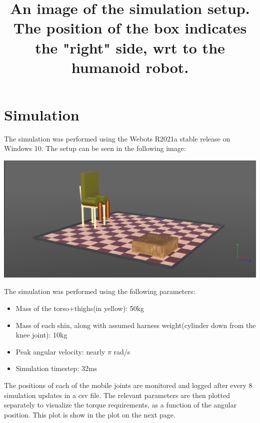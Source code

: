 \documentclass[a4paper]{article}
\begin{document}
	\pagebreak
	\section{Simulation}
		The simulation was performed using the Webots R2021a stable release on Windows 10. The setup can be seen in the following image:

		\begin{center}
			\includegraphics[width=\linewidth]{"../images/sideview.png"}
			\title{An image of the simulation setup. The position of the box indicates the "right" side, wrt to the humanoid robot.}
		\end{center}

		The simulation was performed using the following parameters:
		\begin{itemize}
			\item Mass of the torso+thighs(in yellow): 50kg
			\item Mass of each shin, along with assumed harness weight(cylinder down from the knee joint): 10kg
			\item Peak angular velocity: nearly $\pi$ rad/s
			\item Simulation timestep: 32ms
		\end{itemize}

		The positions of each of the mobile joints are monitored and logged after every 8 simulation updates in a csv file. The relevant parameters are then plotted separately to visualize the torque requirements, as a function of the angular position. This plot is show in the plot on the next page.
\end{document}
